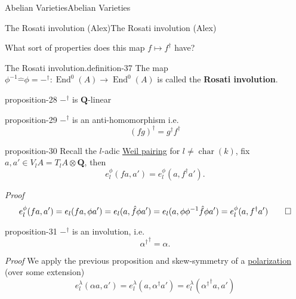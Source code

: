 \documentclass[10pt,]{book}
\makeatletter
\newcommand{\terminology}[1]{\textbf{#1}}
\renewcommand*{\proofname}{Proof}
\renewenvironment{proof}[1][\proofname]{\par
  \pushQED{\qed}%
  \normalfont \topsep6\p@\@plus6\p@\relax
  \trivlist
  \item\relax
    {\itshape
    #1\@addpunct{.}}\hspace\labelsep\ignorespaces
}{%
  \popQED\endtrivlist\@endpefalse
}
\numberwithin{equation}{section}
\newcommand{\inv}{^{-1}}
\newcommand{\QQ}{\mathbf{Q}}
\DeclareMathOperator{\End}{End}
\DeclareMathOperator{\characteristic}{char}
\makeatother
\begin{document}
\begin{chapterptx}{Abelian Varieties}{}{Abelian Varieties}{}{}
\begin{sectionptx}{The Rosati involution (Alex)}{}{The Rosati involution (Alex)}{}{}
\par
\hypertarget{p-332}{}%
What sort of properties does this map \(f \mapsto f^\dagger\) have?%
\begin{definition}{The Rosati involution.}{definition-37}%
\hypertarget{p-333}{}%
The map \(\phi^{-1} \hat{-} \phi =  {-}^\dagger \colon \End^0(A) \to \End^0(A)\) is called the \terminology{Rosati involution}.%
\end{definition}
\begin{proposition}{}{}{proposition-28}%
\hypertarget{p-334}{}%
\(-^\dagger\) is \(\QQ\)-linear%
\end{proposition}
\begin{proposition}{}{}{proposition-29}%
\hypertarget{p-335}{}%
\(-^\dagger\) is an anti-homomorphism i.e.%
\begin{equation*}
(fg)^\dagger = g^\dagger f^\dagger
\end{equation*}
%
\end{proposition}
\begin{proposition}{}{}{proposition-30}%
\hypertarget{p-336}{}%
Recall the \(l\)-adic \hyperref[prop-weil-pair]{Weil pairing} for \(l \ne \characteristic(k)\), fix \(a,a'\in V_lA = T_lA\otimes \QQ\), then%
\begin{equation*}
e_l^\phi(f a ,a') = e_l^\phi(a, f^\dagger a')\text{.}
\end{equation*}
%
\end{proposition}
\begin{proof}\hypertarget{proof-57}{}
\hypertarget{p-337}{}%
%
\begin{equation*}
e_l^\phi(f a ,a')  = e_l(fa, \phi a')= e_l(a, \hat f \phi a') = e_l(a, \phi\phi\inv \hat f \phi a') =  e_l^\phi(a, f^\dagger a')\qedhere
\end{equation*}
%
\end{proof}
\begin{proposition}{}{}{proposition-31}%
\hypertarget{p-338}{}%
\(-^\dagger\) is an involution, i.e.%
\begin{equation*}
{\alpha^\dagger}^{\dagger} = \alpha\text{.}
\end{equation*}
%
\end{proposition}
\begin{proof}\hypertarget{proof-58}{}
\hypertarget{p-339}{}%
We apply the previous proposition and skew-symmetry of a \hyperref[def-polarization]{polarization} (over some extension)%
\begin{equation*}
e_l^\lambda(\alpha a,a') = e_l^\lambda(a, \alpha^\dagger a') = e_l^\lambda({\alpha^\dagger}^{\dagger} a, a')

\end{equation*}
\end{proof}
\end{sectionptx}
\end{chapterptx}
\end{document}

